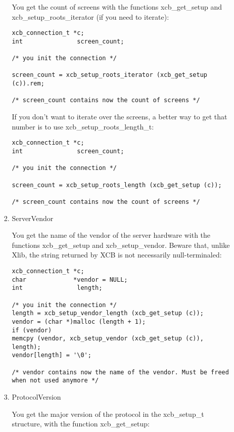 \documentclass[12pt,oneside,titlepage]{book}
\begin{document}
\begin{enumerate}
\begin{enumerate}
\begin{enumerate}
      You get the count of screens with the functions {xcb\_get\_setup}
      and {xcb\_setup\_roots\_iterator} (if you need to iterate):

\begin{verbatim}
xcb_connection_t *c;
int               screen_count;

/* you init the connection */

screen_count = xcb_setup_roots_iterator (xcb_get_setup (c)).rem;

/* screen_count contains now the count of screens */
\end{verbatim}

      If you don't want to iterate over the screens, a better way to get
      that number is to use {xcb\_setup\_roots\_length\_t}:

\begin{verbatim}
xcb_connection_t *c;
int               screen_count;

/* you init the connection */

screen_count = xcb_setup_roots_length (xcb_get_setup (c));

/* screen_count contains now the count of screens */
\end{verbatim}
    \item
      \protect\hypertarget{ServerVendor}{}{}ServerVendor

      You get the name of the vendor of the server hardware with the
      functions {xcb\_get\_setup} and {xcb\_setup\_vendor}. Beware that,
      unlike Xlib, the string returned by XCB is not necessarily
      null-terminaled:

\begin{verbatim}
xcb_connection_t *c;
char             *vendor = NULL;
int               length;

/* you init the connection */
length = xcb_setup_vendor_length (xcb_get_setup (c));
vendor = (char *)malloc (length + 1);
if (vendor)
memcpy (vendor, xcb_setup_vendor (xcb_get_setup (c)), length);
vendor[length] = '\0';

/* vendor contains now the name of the vendor. Must be freed when not used anymore */
\end{verbatim}
    \item
      \protect\hypertarget{ProtocolVersion}{}{}ProtocolVersion

      You get the major version of the protocol in the {xcb\_setup\_t}
      structure, with the function {xcb\_get\_setup}:


\end{enumerate}
\end{enumerate}
\end{enumerate}
\end{document}
